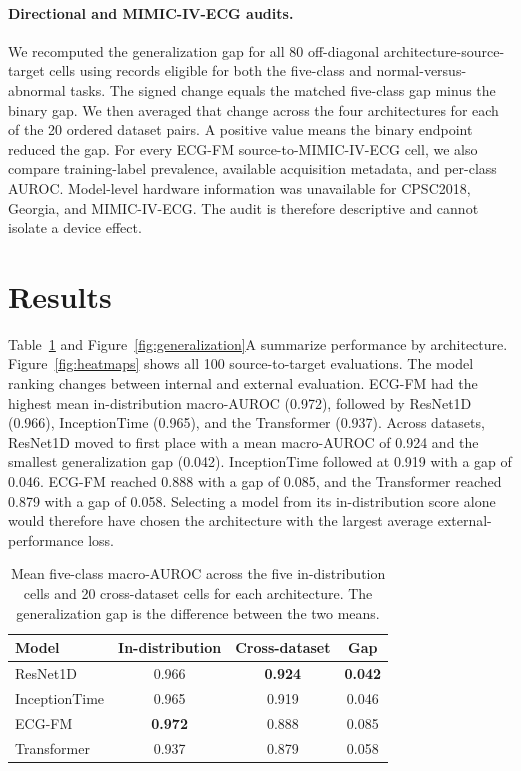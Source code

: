 \documentclass[conference]{IEEEtran}
\begin{document}
\paragraph{Directional and MIMIC-IV-ECG audits.} We recomputed the generalization gap for all 80 off-diagonal architecture-source-target cells using records eligible for both the five-class and normal-versus-abnormal tasks. The signed change equals the matched five-class gap minus the binary gap. We then averaged that change across the four architectures for each of the 20 ordered dataset pairs. A positive value means the binary endpoint reduced the gap. For every ECG-FM source-to-MIMIC-IV-ECG cell, we also compare training-label prevalence, available acquisition metadata, and per-class AUROC. Model-level hardware information was unavailable for CPSC2018, Georgia, and MIMIC-IV-ECG. The audit is therefore descriptive and cannot isolate a device effect.

\section{Results}

Table~\ref{tab:model-summary} and Figure~\ref{fig:generalization}A summarize performance by architecture. Figure~\ref{fig:heatmaps} shows all 100 source-to-target evaluations. The model ranking changes between internal and external evaluation. ECG-FM had the highest mean in-distribution macro-AUROC (0.972), followed by ResNet1D (0.966), InceptionTime (0.965), and the Transformer (0.937). Across datasets, ResNet1D moved to first place with a mean macro-AUROC of 0.924 and the smallest generalization gap (0.042). InceptionTime followed at 0.919 with a gap of 0.046. ECG-FM reached 0.888 with a gap of 0.085, and the Transformer reached 0.879 with a gap of 0.058. Selecting a model from its in-distribution score alone would therefore have chosen the architecture with the largest average external-performance loss.

\begin{table}[!htbp]
    \caption{Mean five-class macro-AUROC across the five in-distribution cells and 20 cross-dataset cells for each architecture. The generalization gap is the difference between the two means.}
    \label{tab:model-summary}
    \centering
    \small
    \begin{tabular}{lccc}
        \toprule
        Model & In-distribution & Cross-dataset & Gap \\
        \midrule
        ResNet1D      & 0.966 & \textbf{0.924} & \textbf{0.042} \\
        InceptionTime & 0.965 & 0.919 & 0.046 \\
        ECG-FM        & \textbf{0.972} & 0.888 & 0.085 \\
        Transformer   & 0.937 & 0.879 & 0.058 \\
        \bottomrule
    \end{tabular}
\end{table}
\end{document}
